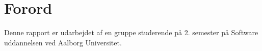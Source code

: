 \chapter*{Forord}
Denne rapport er udarbejdet af en gruppe studerende på 2. semester på Software uddannelsen ved Aalborg Universitet.
